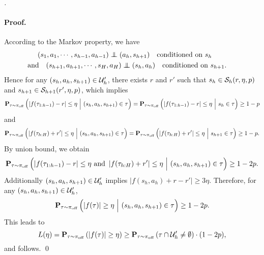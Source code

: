 \documentclass{article}
\let\oldparagraph\paragraph
\renewcommand{\paragraph}[1]{\oldparagraph{#1.}}
\begin{document}
\begin{proof}[]
    \paragraph{Proof} According to the Markov property, we have 
    \begin{align*} 
        & (s_1, a_1, \cdots, s_{h-1}, a_{h-1}) \indep (a_h, s_{h+1})\quad\text{conditioned on }s_h\\
        & \hspace{-0.5cm} \text{and}\quad (s_{h+1}, a_{h+1}, \cdots, s_{H}, a_{H}) \indep (s_h, a_h)\quad\text{conditioned on }s_{h+1}.
    \end{align*}
    Hence for any $(s_h, a_h, s_{h+1})\in \mathcal{U}_h'$, there exists $r$ and $r'$ such that $s_h\in \mathcal{S}_h(r, \eta, p)$ and $s_{h+1}\in \mathcal{S}_{h+1}(r', \eta, p)$, which implies
    \begin{align*}
        \mathbf{P}_{\tau\sim \pi_{\mathrm{off}}}\left(\left|f(\tau_{1:h-1}) - r\right|\le \eta\ \Big{|}\ (s_h, a_h, s_{h+1})\in \tau\right) = \mathbf{P}_{\tau\sim \pi_{\mathrm{off}}}\left(\left|f(\tau_{1:h-1}) - r\right|\le \eta\ \Big{|}\ s_h\in \tau\right)\ge 1- p
    \end{align*}
    and 
    \begin{align*}
        \bP_{\tau\sim \pioff}\left(\left|f(\tau_{h:H}) + r'\right|\le \eta\ \Big{|}\ (s_h, a_h, s_{h+1})\in \tau\right) = \bP_{\tau\sim \pioff}\left(\left|f(\tau_{h:H}) + r'\right|\le \eta\ \Big{|}\ s_{h+1}\in \tau\right)\ge 1- p.
    \end{align*}
    By union bound, we obtain
    \[\bP_{\tau\sim \pioff}\left(\left|f(\tau_{1:h-1}) - r\right|\le \eta\text{ and }\left|f(\tau_{h:H}) + r'\right|\le \eta\ \Big{|}\ (s_h, a_h, s_{h+1})\in \tau\right)\ge 1 - 2p.\]
    Additionally $(s_h, a_h, s_{h+1})\in \mathcal{U}_h'$ implies $\left|f(s_h, a_h) + r - r'\right|\ge 3\eta$. Therefore, for any $(s_h, a_h, s_{h+1})\in \mathcal{U}_h'$,
    \[\mathbf{P}_{\tau\sim \pi_{\mathrm{off}}}\left(\left|f(\tau)\right|\ge \eta\ \Big{|}\ (s_h, a_h, s_{h+1})\in \tau\right)\ge 1 - 2p.\]
    This leads to
    \[L(\eta) = \mathbf{P}_{\tau\sim \pi_{\mathrm{off}}}\left(|f(\tau)|\ge \eta\right)\ge \mathbf{P}_{\tau\sim \pi_{\mathrm{off}}}\left(\tau\cap \mathcal{U}_h'\neq\emptyset\right)\cdot (1-2p),\]
    and  follows. \qed


\end{proof}
\end{document}
